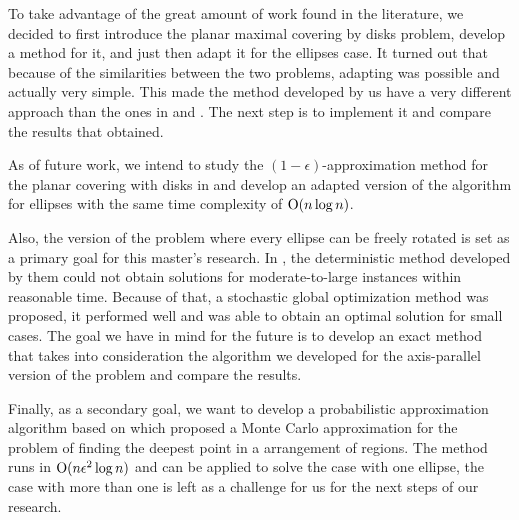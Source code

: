 To take advantage of the great amount of work found in the literature,
 we decided to first introduce the planar maximal covering by disks problem, develop a method for it, and just then adapt it for the ellipses case. It turned out that because of the similarities between the two problems, adapting was possible and actually very simple. This made the method developed by us have a very different approach than the ones in \cite{andreta} and \cite{canbolat}. The next step is to implement it and compare the results that \cite{andreta} obtained.
 
As of future work, we intend to study the $(1-\epsilon)$-approximation method for the planar covering with disks in \cite{cabello:2006} and develop an adapted version of the algorithm for ellipses with the same time complexity of $\mathrm{O}(n\log{n})$.

Also, the version of the problem where every ellipse can be freely rotated is set as a primary goal for this master's research. In \cite{andreta}, the deterministic method developed by them could not obtain solutions for moderate-to-large instances within reasonable time. Because of that, a stochastic global optimization method was proposed, it performed well and was able to obtain an optimal solution for small cases. The goal we have in mind for the future is to develop an exact method that takes into consideration the algorithm we developed for the axis-parallel version of the problem and compare the results.

Finally, as a secondary goal, we want to develop a probabilistic approximation algorithm based on \cite{aronov:2008} which proposed a Monte Carlo approximation for the problem of finding the deepest point in a arrangement of regions. The method runs in $\mathrm{O}(n\epsilon^2\log{n})$ and can be applied to solve the case with one ellipse, the case with more than one is left as a challenge for us for the next steps of our research.


